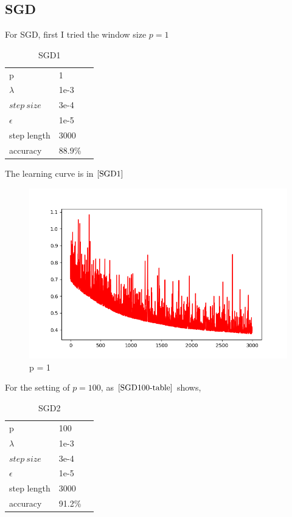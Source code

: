 \documentclass[a4paper,12pt]{article}
\begin{document}
\subsection{SGD}

For SGD, first I tried the window size $p = 1$

\begin{table}[htbp]
    \caption{SGD1}
    \label{SGD1-table}
    \centering
    \begin{tabular}{lll}
        p & 1 \\
      $\lambda$     &  1e-3 \\
      $step\ size$ &   3e-4   \\
      $\epsilon$     &  1e-5     \\
      step length     &   3000 \\
      accuracy & 88.9\% 
    \end{tabular}
  \end{table}

The learning curve is in $\ref{SGD1}$
  \begin{figure}[htbp]
    \centering
    \includegraphics[width = .8\textwidth]{SGD1}
    \caption{p = 1}
    \label{SGD1}
\end{figure}


For the setting of $p = 100$, as $\ref{SGD100-table}$ shows,

\begin{table}[htbp]
    \caption{SGD2}
    \label{SGD100-table}
    \centering
    \begin{tabular}{lll}
        p & 100 \\
      $\lambda$     &  1e-3 \\
      $step\ size$ &   3e-4   \\
      $\epsilon$     &  1e-5     \\
      step length     &   3000 \\
      accuracy & 91.2\% 
    \end{tabular}
  \end{table}
\end{document}
